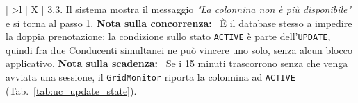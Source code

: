 \begin{xltabular}{\textwidth}{| >{\bfseries}l | X |}
3.3. Il sistema mostra il messaggio \textit{"La colonnina non è più disponibile"} e si torna al passo 1. \newline\newline
\textbf{Nota sulla concorrenza:} \newline
\textbullet\ È il database stesso a impedire la doppia prenotazione: la condizione sullo stato \texttt{ACTIVE} è parte dell'\texttt{UPDATE}, quindi fra due Conducenti simultanei ne può vincere uno solo, senza alcun blocco applicativo. \newline\newline
\textbf{Nota sulla scadenza:} \newline
\textbullet\ Se i 15 minuti trascorrono senza che venga avviata una sessione, il \texttt{GridMonitor} riporta la colonnina ad \texttt{ACTIVE} (Tab.~\ref{tab:uc_update_state}). \\ \hline

\end{xltabular}
